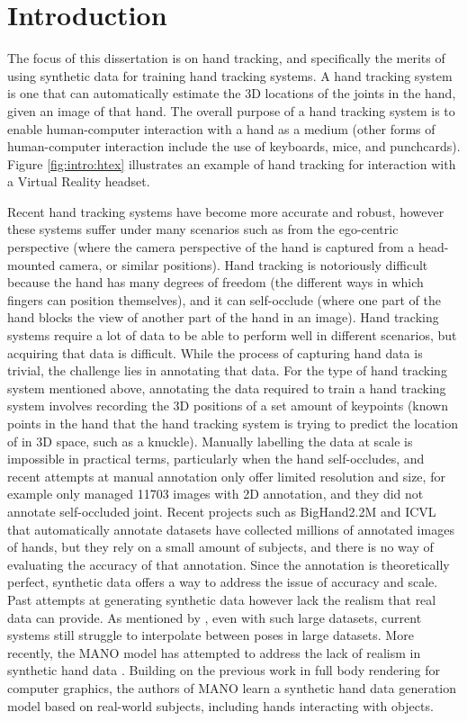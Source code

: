 \chapter{Introduction}
The focus of this dissertation is on hand tracking, and specifically the merits of using synthetic data for training hand tracking systems. A hand tracking system is one that can automatically estimate the 3D locations of the joints in the hand, given an image of that hand. The overall purpose of a hand tracking system is to enable human-computer interaction with a hand as a medium (other forms of human-computer interaction include the use of keyboards, mice, and punchcards). Figure \ref{fig:intro:htex} illustrates an example of hand tracking for interaction with a Virtual Reality headset.

Recent hand tracking systems have become more accurate and robust, however these systems suffer under many scenarios such as from the ego-centric perspective (where the camera perspective of the hand is captured from a head-mounted camera, or similar positions). Hand tracking is notoriously difficult because the hand has many degrees of freedom (the different ways in which fingers can position themselves), and it can self-occlude (where one part of the hand blocks the view of another part of the hand in an image). Hand tracking systems require a lot of data to be able to perform well in different scenarios, but acquiring that data is difficult. While the process of capturing hand data is trivial, the challenge lies in annotating that data. For the type of hand tracking system mentioned above, annotating the data required to train a hand tracking system involves recording the 3D positions of a set amount of keypoints (known points in the hand that the hand tracking system is trying to predict the location of in 3D space, such as a knuckle). Manually labelling the data at scale is impossible in practical terms, particularly when the hand self-occludes, and recent attempts at manual annotation only offer limited resolution and size, \cite{wang2018mask} for example only managed 11703 images with 2D annotation, and they did not annotate self-occluded joint. Recent projects such as BigHand2.2M\cite{yuan2017bighand2} and ICVL\cite{tang2016latent} that automatically annotate datasets have collected millions of annotated images of hands, but they rely on a small amount of subjects, and there is no way of evaluating the accuracy of that annotation. Since the annotation is theoretically perfect, synthetic data offers a way to address the issue of accuracy and scale. Past attempts at generating synthetic data however lack the realism that real data can provide\cite{mueller2017real, malik2018deephps}. As mentioned by \cite{armagan2020measuring}, even with such large datasets, current systems still struggle to interpolate between poses in large datasets. More recently, the MANO model has attempted to address the lack of realism in synthetic hand data \cite{romero2017embodied}. Building on the previous work in full body rendering for computer graphics, the authors of MANO learn a synthetic hand data generation model based on real-world subjects, including hands interacting with objects.

